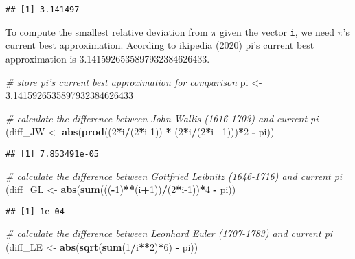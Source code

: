 \documentclass[
]{article}
\newenvironment{Shaded}{\begin{snugshade}}{\end{snugshade}}
\newcommand{\CommentTok}[1]{\textcolor[rgb]{0.56,0.35,0.01}{\textit{#1}}}
\newcommand{\DecValTok}[1]{\textcolor[rgb]{0.00,0.00,0.81}{#1}}
\newcommand{\FloatTok}[1]{\textcolor[rgb]{0.00,0.00,0.81}{#1}}
\newcommand{\KeywordTok}[1]{\textcolor[rgb]{0.13,0.29,0.53}{\textbf{#1}}}
\newcommand{\NormalTok}[1]{#1}
\newcommand{\OperatorTok}[1]{\textcolor[rgb]{0.81,0.36,0.00}{\textbf{#1}}}
\newcommand{\StringTok}[1]{\textcolor[rgb]{0.31,0.60,0.02}{#1}}
\begin{document}
\begin{verbatim}
## [1] 3.141497
\end{verbatim}

To compute the smallest relative deviation from \(\pi\) given the vector
\texttt{i}, we need \(\pi\)'s current best approximation. Acording to
ikipedia (2020) pi's current best approximation is
3.1415926535897932384626433.

\begin{Shaded}
\begin{Highlighting}[]
\CommentTok{# store pi's current best approximation for comparison}
\NormalTok{pi <-}\StringTok{ }\FloatTok{3.1415926535897932384626433}

\CommentTok{# calculate the difference between John Wallis (1616-1703) and current pi}
\NormalTok{(diff_JW <-}\StringTok{ }\KeywordTok{abs}\NormalTok{(}\KeywordTok{prod}\NormalTok{((}\DecValTok{2}\OperatorTok{*}\NormalTok{i}\OperatorTok{/}\NormalTok{(}\DecValTok{2}\OperatorTok{*}\NormalTok{i}\DecValTok{-1}\NormalTok{)) }\OperatorTok{*}\StringTok{ }\NormalTok{(}\DecValTok{2}\OperatorTok{*}\NormalTok{i}\OperatorTok{/}\NormalTok{(}\DecValTok{2}\OperatorTok{*}\NormalTok{i}\OperatorTok{+}\DecValTok{1}\NormalTok{)))}\OperatorTok{*}\DecValTok{2} \OperatorTok{-}\StringTok{ }\NormalTok{pi))}
\end{Highlighting}
\end{Shaded}

\begin{verbatim}
## [1] 7.853491e-05
\end{verbatim}

\begin{Shaded}
\begin{Highlighting}[]
\CommentTok{# calculate the difference between Gottfried Leibnitz (1646-1716) and current pi}
\NormalTok{(diff_GL <-}\StringTok{ }\KeywordTok{abs}\NormalTok{(}\KeywordTok{sum}\NormalTok{(((}\OperatorTok{-}\DecValTok{1}\NormalTok{)}\OperatorTok{**}\NormalTok{(i}\OperatorTok{+}\DecValTok{1}\NormalTok{))}\OperatorTok{/}\NormalTok{(}\DecValTok{2}\OperatorTok{*}\NormalTok{i}\DecValTok{-1}\NormalTok{))}\OperatorTok{*}\DecValTok{4} \OperatorTok{-}\StringTok{ }\NormalTok{pi))}
\end{Highlighting}
\end{Shaded}

\begin{verbatim}
## [1] 1e-04
\end{verbatim}

\begin{Shaded}
\begin{Highlighting}[]
\CommentTok{# calculate the difference between Leonhard Euler (1707-1783) and current pi}
\NormalTok{(diff_LE <-}\StringTok{ }\KeywordTok{abs}\NormalTok{(}\KeywordTok{sqrt}\NormalTok{(}\KeywordTok{sum}\NormalTok{(}\DecValTok{1}\OperatorTok{/}\NormalTok{i}\OperatorTok{**}\DecValTok{2}\NormalTok{)}\OperatorTok{*}\DecValTok{6}\NormalTok{) }\OperatorTok{-}\StringTok{ }\NormalTok{pi))}
\end{Highlighting}
\end{Shaded}
\end{document}
